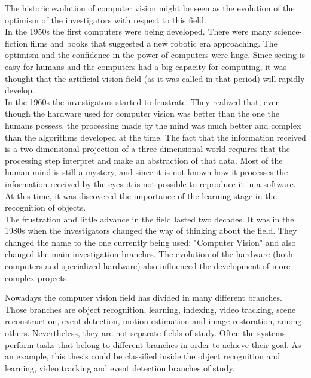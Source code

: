 
The historic evolution of computer vision might be seen as the evolution of the optimism of the investigators with respect to this field. 
\\

In the 1950s the first computers were being developed. There were many science-fiction films and books that suggested a new robotic era approaching. The optimism and the confidence in the power of computers were huge. 
Since seeing is easy for humans and the computers had a big capacity for computing, it was thought that the artificial vision field (as it was called in that period) will rapidly develop. 
\\

In the 1960s the investigators started to frustrate. They realized that, even though the hardware used for computer vision was better than the one the humans possess, the processing made by the mind was much better and complex than the algorithms developed at the time. 
The fact that the information received is a two-dimensional projection of a three-dimensional world requires that the processing step interpret and make an abstraction of that data. Most of the human mind is still a mystery, and since it is not known how it processes the information received by the eyes it is not possible to reproduce it in a software. 
At this time, it was discovered the importance of the learning stage in the recognition of objects. 
\\

The frustration and little advance in the field lasted two decades. It was in the 1980s when the investigators changed the way of thinking about the field. They changed the name to the one currently being used: "Computer Vision" and also changed the main investigation branches.
The evolution of the hardware (both computers and specialized hardware) also influenced the development of more complex projects. 

Nowadays the computer vision field has divided in many different branches. 
Those branches are object recognition, learning, indexing, video tracking, scene reconstruction, event detection, motion estimation and image restoration, among others. 
Nevertheless, they are not separate fields of study. 
Often the systems perform tasks that belong to different branches in order to achieve their goal. 
As an example, this thesis could be classified inside the object recognition and learning, video tracking and event detection branches of study. 
\\


